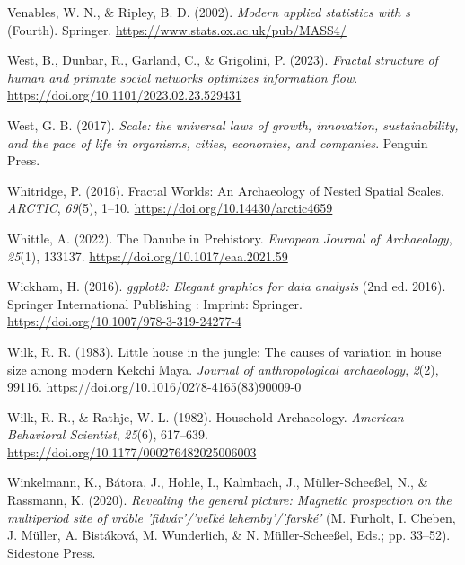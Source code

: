 \documentclass[
  12pt,
]{book}
\newlength{\cslhangindent}
\newlength{\cslentryspacingunit} %
\newenvironment{CSLReferences}[2] %
 {%
  \setlength{\parindent}{0pt}
  \ifodd #1
  \let\oldpar\par
  \def\par{\hangindent=\cslhangindent\oldpar}
  \fi
  \setlength{\parskip}{#2\cslentryspacingunit}
 }%
 {}
\begin{document}
\begin{CSLReferences}{1}{0}
\leavevmode{}%
Venables, W. N., \& Ripley, B. D. (2002). \emph{Modern applied statistics with s} (Fourth). Springer. \url{https://www.stats.ox.ac.uk/pub/MASS4/}

\leavevmode{}%
West, B., Dunbar, R., Garland, C., \& Grigolini, P. (2023). \emph{Fractal structure of human and primate social networks optimizes information flow}. \url{https://doi.org/10.1101/2023.02.23.529431}

\leavevmode{}%
West, G. B. (2017). \emph{Scale: the universal laws of growth, innovation, sustainability, and the pace of life in organisms, cities, economies, and companies}. Penguin Press.

\leavevmode{}%
Whitridge, P. (2016). Fractal Worlds: An Archaeology of Nested Spatial Scales. \emph{ARCTIC}, \emph{69}(5), 1--10. \url{https://doi.org/10.14430/arctic4659}

\leavevmode{}%
Whittle, A. (2022). The Danube in Prehistory. \emph{European Journal of Archaeology}, \emph{25}(1), 133137. \url{https://doi.org/10.1017/eaa.2021.59}

\leavevmode{}%
Wickham, H. (2016). \emph{ggplot2: Elegant graphics for data analysis} (2nd ed. 2016). Springer International Publishing : Imprint: Springer. \url{https://doi.org/10.1007/978-3-319-24277-4}

\leavevmode{}%
Wilk, R. R. (1983). Little house in the jungle: The causes of variation in house size among modern Kekchi Maya. \emph{Journal of anthropological archaeology}, \emph{2}(2), 99116. \url{https://doi.org/10.1016/0278-4165(83)90009-0}

\leavevmode{}%
Wilk, R. R., \& Rathje, W. L. (1982). Household Archaeology. \emph{American Behavioral Scientist}, \emph{25}(6), 617--639. \url{https://doi.org/10.1177/000276482025006003}

\leavevmode{}%
Winkelmann, K., Bátora, J., Hohle, I., Kalmbach, J., Müller-Scheeßel, N., \& Rassmann, K. (2020). \emph{Revealing the general picture: Magnetic prospection on the multiperiod site of vráble 'fidvár'/'ve{ľ}ké lehemby'/'farské'} (M. Furholt, I. Cheben, J. Müller, A. Bistáková, M. Wunderlich, \& N. Müller-Scheeßel, Eds.; pp. 33--52). Sidestone Press.


\end{CSLReferences}
\end{document}
